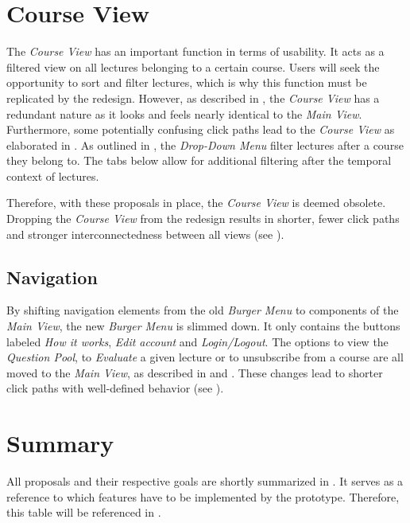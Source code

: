 \section{Course View}
The \emph{Course View} has an important function in terms of usability. It acts as a filtered view on all lectures belonging to a certain course. Users will seek the opportunity to sort and filter lectures, which is why this function must be replicated by the redesign. However, as described in , the \emph{Course View} has a redundant nature as it looks and feels nearly identical to the \emph{Main View}.
Furthermore, some potentially confusing click paths lead to the \emph{Course View} as elaborated in .
As outlined in , the \emph{Drop-Down Menu} filter lectures after a course they belong to. The tabs below allow for additional filtering after the temporal context of lectures. 

Therefore, with these proposals in place, the \emph{Course View} is deemed obsolete. Dropping the \emph{Course View} from the redesign results in shorter, fewer click paths and stronger interconnectedness between all views (see ).

\subsection{Navigation}
By shifting navigation elements from the old \emph{Burger Menu} to components of the \emph{Main View}, the new \emph{Burger Menu} is slimmed down.
It only contains the buttons labeled \emph{How it works}, \emph{Edit account} and \emph{Login/Logout}. The options to view the \emph{Question Pool}, to \emph{Evaluate} a given lecture or to unsubscribe from a course are all moved to the \emph{Main View}, as described in   and .
These changes lead to shorter click paths with well-defined behavior (see \todogrf).

\section{Summary}
All proposals and their respective goals are shortly summarized in . It serves as a reference to which features have to be implemented by the prototype. Therefore, this table will be referenced in .

